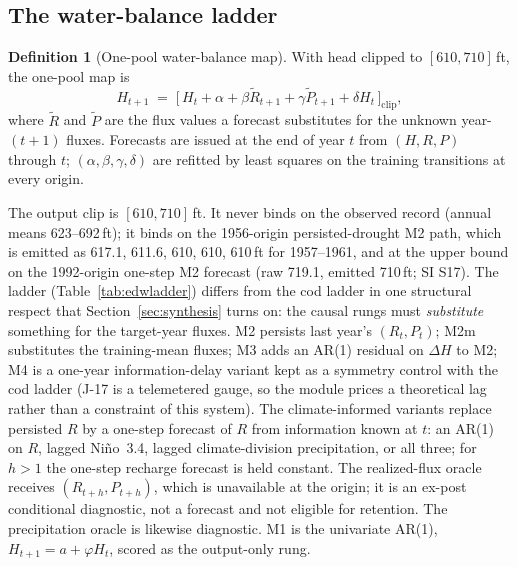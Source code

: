 \documentclass[preprint,11pt,authoryear]{elsarticle}
\theoremstyle{definition}
\newtheorem{definition}{Definition}
\theoremstyle{remark}
\begin{document}
\subsection{The water-balance ladder}\label{sec:edw_ladder}

\begin{definition}[One-pool water-balance map]\label{def:pool}
With head clipped to $[610,710]$\,ft, the one-pool map is
\begin{equation}\label{eq:pool}
H_{t+1} \;=\; \bigl[\,H_t + \alpha + \beta\tilde R_{t+1} + \gamma\tilde P_{t+1} + \delta H_t\,\bigr]_{\mathrm{clip}},
\end{equation}
where $\tilde R$ and $\tilde P$ are the flux values a forecast substitutes for the unknown year-$(t+1)$ fluxes. Forecasts are issued at the end of year $t$ from $(H,R,P)$ through $t$; $(\alpha,\beta,\gamma,\delta)$ are refitted by least squares on the training transitions at every origin.
\end{definition}

The output clip is $[610,710]$\,ft. It never binds on the observed record (annual means 623--692\,ft); it binds on the 1956-origin persisted-drought M2 path, which is emitted as 617.1, 611.6, 610, 610, 610\,ft for 1957--1961, and at the upper bound on the 1992-origin one-step M2 forecast (raw 719.1, emitted 710\,ft; SI S17). The ladder (Table~\ref{tab:edwladder}) differs from the cod ladder in one structural respect that Section~\ref{sec:synthesis} turns on: the causal rungs must \emph{substitute} something for the target-year fluxes. M2 persists last year's $(R_t,P_t)$; M2m substitutes the training-mean fluxes; M3 adds an AR(1) residual on $\Delta H$ to M2; M4 is a one-year information-delay variant kept as a symmetry control with the cod ladder (J-17 is a telemetered gauge, so the module prices a theoretical lag rather than a constraint of this system). The climate-informed variants replace persisted $R$ by a one-step forecast of $R$ from information known at $t$: an AR(1) on $R$, lagged Ni\~no~3.4, lagged climate-division precipitation, or all three; for $h>1$ the one-step recharge forecast is held constant. The realized-flux oracle receives $(R_{t+h},P_{t+h})$, which is unavailable at the origin; it is an ex-post conditional diagnostic, not a forecast and not eligible for retention. The precipitation oracle is likewise diagnostic. M1 is the univariate AR(1), $H_{t+1}=a+\varphi H_t$, scored as the output-only rung.
\end{document}
